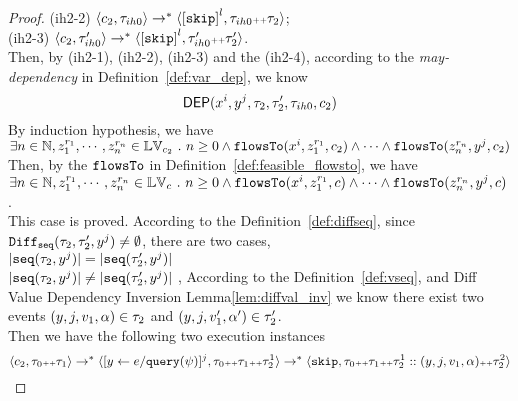 \begin{proof}
(ih2-2) $\config{c_2 , \trace_{ih0}} 
\rightarrow^{*} \config{\clabel{\eskip}^l, \trace_{ih0}  \tracecat \trace_2}$;
\\
(ih2-3) $\config{c_2, \trace_{ih0}'}
\rightarrow^{*} \config{\clabel{\eskip}^l, \trace_{ih0}'  \tracecat \trace_2'}$.
\\
Then, by (ih2-1), (ih2-2), (ih2-3) and the (ih2-4), 
according to the \emph{may-dependency} in Definition~\ref{def:var_dep}, we know
\[
  \mathsf{DEP}(x^i, y^j, \mathtt{\tau}_2, \mathtt{\tau}_2', \mathtt{\tau}_{ih0}, c_2)
\] 
%
By induction hypothesis, we have 
\\
$\exists n \in \mathbb{N}, z_1^{r_1}, \cdots, z_n^{r_n} \in \mathbb{LV}_{{c_2}} ~.~   n \geq 0 \land
\mathtt{flowsTo}(x^i,  z_1^{r_1}, c_2) 
\land \cdots \land \mathtt{flowsTo}(z_n^{r_n}, y^j, c_2)$
\\
Then, by the $\mathtt{flowsTo}$ in Definition~\ref{def:feasible_flowsto}, we have 
\\
$\exists n \in \mathbb{N}, z_1^{r_1}, \cdots, z_n^{r_n} \in \mathbb{LV}_{{c}} ~.~   n \geq 0 \land
\mathtt{flowsTo}(x^i,  z_1^{r_1}, c) 
\land \cdots \land \mathtt{flowsTo}(z_n^{r_n}, y^j, c)$.
\\
This case is proved.
%
According to the Definition~\ref{def:diffseq}, since $\mathtt{Diff}_{\mathtt{seq}}(\mathtt{\tau}_2, \mathtt{\tau}_2', y^j) \neq \emptyset$, there are
two cases,
\\
$|\mathtt{seq}(\mathtt{\tau}_2, y^j)| = |\mathtt{seq}(\mathtt{\tau}_2', y^j)|$
\\
$|\mathtt{seq}(\mathtt{\tau}_2, y^j)| \neq |\mathtt{seq}(\mathtt{\tau}_2', y^j)|$
, 
According to the Definition~\ref{def:vseq},
and {Diff Value Dependency Inversion Lemma\ref{lem:diffval_inv}} we know 
there exist two events $(y, j, v_1, \alpha) \in \mathtt{\tau}_2$ and $(y, j, v_1', \alpha') \in \mathtt{\tau}_2'$.
\\
Then we have the following two execution instances 
\\
\begin{equation}
  \label{eq:flowstosound_seq_valdep_inv1}
\langle c_2, \mathtt{\tau}_0 {\scriptscriptstyle ++} \mathtt{\tau}_1 \rangle \rightarrow^{*} 
\langle [\mathrel{ y \leftarrow e / {\tt query}(\psi) }]{}^{j}, \mathtt{\tau}_0 {\scriptscriptstyle ++} \mathtt{\tau}_1 {\scriptscriptstyle ++} \mathtt{\tau}_2^1 \rangle 
\rightarrow^* \langle \mathtt{skip}, \mathtt{\tau}_0 {\scriptscriptstyle ++} \mathtt{\tau}_1 {\scriptscriptstyle ++} \mathtt{\tau}_2^1 ::(y, j, v_1, \alpha) {\scriptscriptstyle ++} \mathtt{\tau}_2^2 \rangle  
\end{equation}
%
\begin{equation}
  \label{eq:flowstosound_seq_valdep_inv2}

\end{equation}
\end{proof}
